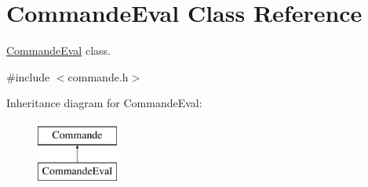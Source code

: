 \hypertarget{class_commande_eval}{\section{Commande\-Eval Class Reference}
\label{class_commande_eval}
}


\hyperlink{class_commande_eval}{Commande\-Eval} class.  




{\ttfamily \#include $<$commande.\-h$>$}

Inheritance diagram for Commande\-Eval\-:\begin{figure}[H]
\begin{center}
\leavevmode
\includegraphics[height=2.000000cm]{class_commande_eval}
\end{center}
\end{figure}
